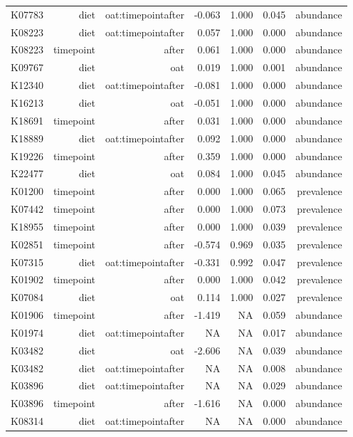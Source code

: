 \documentclass[
]{article}
\begin{document}
\begin{longtable}[t]{lrrrrrr}
\addlinespace
K07783 & diet & oat:timepointafter & -0.063 & 1.000 & 0.045 & abundance\\
K08223 & diet & oat:timepointafter & 0.057 & 1.000 & 0.000 & abundance\\
K08223 & timepoint & after & 0.061 & 1.000 & 0.000 & abundance\\
K09767 & diet & oat & 0.019 & 1.000 & 0.001 & abundance\\
K12340 & diet & oat:timepointafter & -0.081 & 1.000 & 0.000 & abundance\\
\addlinespace
K16213 & diet & oat & -0.051 & 1.000 & 0.000 & abundance\\
K18691 & timepoint & after & 0.031 & 1.000 & 0.000 & abundance\\
K18889 & diet & oat:timepointafter & 0.092 & 1.000 & 0.000 & abundance\\
K19226 & timepoint & after & 0.359 & 1.000 & 0.000 & abundance\\
K22477 & diet & oat & 0.084 & 1.000 & 0.045 & abundance\\
\addlinespace
K01200 & timepoint & after & 0.000 & 1.000 & 0.065 & prevalence\\
K07442 & timepoint & after & 0.000 & 1.000 & 0.073 & prevalence\\
K18955 & timepoint & after & 0.000 & 1.000 & 0.039 & prevalence\\
K02851 & timepoint & after & -0.574 & 0.969 & 0.035 & prevalence\\
K07315 & diet & oat:timepointafter & -0.331 & 0.992 & 0.047 & prevalence\\
\addlinespace
K01902 & timepoint & after & 0.000 & 1.000 & 0.042 & prevalence\\
K07084 & diet & oat & 0.114 & 1.000 & 0.027 & prevalence\\
K01906 & timepoint & after & -1.419 & NA & 0.059 & abundance\\
K01974 & diet & oat:timepointafter & NA & NA & 0.017 & abundance\\
K03482 & diet & oat & -2.606 & NA & 0.039 & abundance\\
\addlinespace
K03482 & diet & oat:timepointafter & NA & NA & 0.008 & abundance\\
K03896 & diet & oat:timepointafter & NA & NA & 0.029 & abundance\\
K03896 & timepoint & after & -1.616 & NA & 0.000 & abundance\\
K08314 & diet & oat:timepointafter & NA & NA & 0.000 & abundance\\

\end{longtable}
\end{document}
